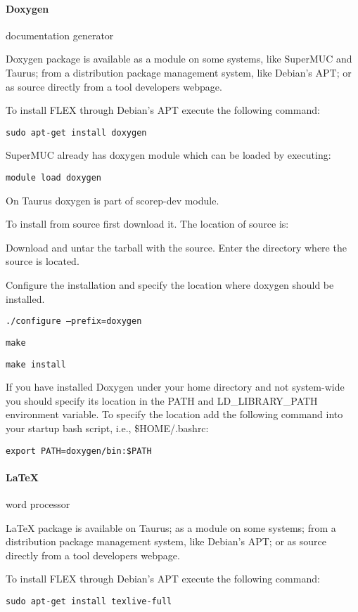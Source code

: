 \paragraph{Doxygen} documentation generator

Doxygen package is available as a module on some systems, like SuperMUC and
Taurus; from a distribution package management system, like Debian's APT; or as
source directly from a tool developers webpage.

To install FLEX through Debian's APT execute the following command:

\texttt{sudo apt-get install doxygen}

SuperMUC already has doxygen module which can be loaded by executing:

\texttt{module load doxygen}

On Taurus doxygen is part of scorep-dev module.

To install from source first download it.
The location of source is:

\doxygenurl

Download and untar the tarball with the source.
Enter the directory where the source is located.

Configure the installation and specify the location where doxygen should be
installed.

\texttt{./configure --prefix=\installloc doxygen}

\texttt{make}

\texttt{make install}

If you have installed Doxygen under your home directory and not system-wide you
should specify its location in the PATH and LD\_LIBRARY\_PATH environment
variable. To specify the location add the following command into your startup
bash script, i.e., \$HOME/.bashrc:

\texttt{export PATH=\installloc doxygen/bin:\$PATH}

\paragraph{LaTeX} word processor

LaTeX package is available on Taurus; as a module on some systems; from a
distribution package management system, like Debian's APT; or as source directly
from a tool developers webpage.

To install FLEX through Debian's APT execute the following command:

\texttt{sudo apt-get install texlive-full}

